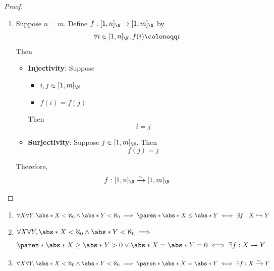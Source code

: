 \begin{proof}
\begin{enumerate}[label=\textbf{(\Alph*)}]
\begin{itemize}
\begin{itemize}
                          \[
                            f(j) = j
                          \]
                  \end{itemize}
          \end{itemize}
    \item Suppose $n = m$. Define $f: [1, n]_{\N} \to [1, m]_{\N}$ by
          \[
            \forall i \in [1, n]_{\N}, f(i) \coloneqq i
          \]
          Then
          \begin{itemize}
            \item \textbf{Injectivity}: Suppose
                  \begin{itemize}
                    \item $i, j \in [1, m]_{\N}$
                    \item $f(i) = f(j)$
                  \end{itemize}
                  Then
                  \[
                    i = j
                  \]
            \item \textbf{Surjectivity}: Suppose $j \in [1, m]_{\N}$. Then
                  \[
                    f(j) = j
                  \]
          \end{itemize}
          Therefore,
          \[
            f: [1, n]_{\N} \xrightarrow{\sim} [1, m]_{\N}
          \]
  \end{enumerate}
\end{proof}

\begin{theorem} \label{an1:thm:properties-of-cardinality}
  \leavevmode\par
  \begin{enumerate}[label=\textbf{(\Alph*)}]
    \item $\forall X \forall Y, \abs*{X} < \aleph_{0} \land \abs*{Y} < \aleph_{0} \implies
            \paren*{\abs*{X} \leq \abs*{Y} \iff \exists f: X \hookrightarrow Y}$
    \item $\forall X \forall Y, \abs*{X} < \aleph_{0} \land \abs*{Y} < \aleph_{0} \implies$
          \[
            \paren*{\abs*{X} \geq \abs*{Y} > 0 \lor \abs*{X} = \abs*{Y} = 0 \iff \exists f: X \twoheadrightarrow Y}
          \]
    \item $\forall X \forall Y, \abs*{X} < \aleph_{0} \land \abs*{Y} < \aleph_{0} \implies
            \paren*{\abs*{X} = \abs*{Y} \iff \exists f: X \xrightarrow{\sim} Y}$
  \end{enumerate}
\end{theorem}

